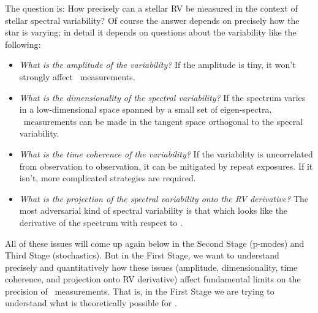 \documentclass[12pt, letterpaper]{article}
\begin{document}
The question is: How precisely can a stellar RV be measured in the context
of stellar spectral variability?
Of course the answer depends on precisely how the star is varying;
in detail it depends on questions about the variability like the following:
\begin{itemize}
\item
\emph{What is the amplitude of the variability?}
If the amplitude is tiny, it won't strongly affect \RV\ measurements.
\item
\emph{What is the dimensionality of the spectral variability?}
If the spectrum varies in a low-dimensional space spanned by a small set
of eigen-spectra, \EPRV\ measurements can be made in the tangent space
orthogonal to the specral variability.
\item
\emph{What is the time coherence of the variability?}
If the variability is uncorrelated from observation to observation, it
can be mitigated by repeat exposures. If it isn't, more complicated
strategies are required.
\item
\emph{What is the projection of the spectral variability onto the RV derivative?}
The most adversarial kind of spectral variability is that which looks
like the derivative of the spectrum with respect to \RV.
\end{itemize}
All of these issues will come up again below in the Second Stage (p-modes)
and Third Stage (stochastics).
But in the First Stage, we want to understand precisely and quantitatively
how these issues (amplitude, dimensionality, time coherence, and projection
onto RV derivative) affect fundamental limits on the precision of
\EPRV\ measurements.
That is, in the First Stage we are trying to understand what is theoretically
possible for \EPRV.
\end{document}
